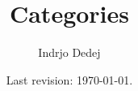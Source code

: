 




\title{Categories}
\author{Indrjo Dedej}
\date{Last revision: \today{}.}



\maketitle

\tableofcontents

%










